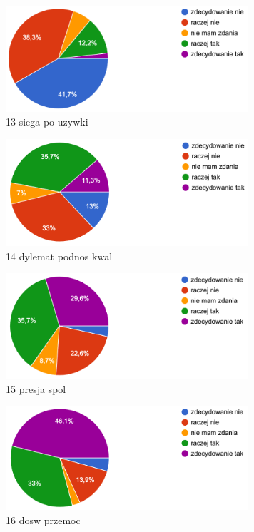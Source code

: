 \documentclass[a4paper,12pt,twoside,openany]{report}
\begin{document}
\begin{figure}
    \includegraphics[width=9cm]{wyniki/13_siega_po_uzywki}
    \caption{ 13 siega po uzywki }
\end{figure}

\begin{figure}
    \includegraphics[width=9cm]{wyniki/14_dylemat_podnos_kwal}
    \caption{ 14 dylemat podnos kwal }
\end{figure}

\begin{figure}
    \includegraphics[width=9cm]{wyniki/15_presja_spol}
    \caption{ 15 presja spol }
\end{figure}

\begin{figure}
    \includegraphics[width=9cm]{wyniki/16_dosw_przemoc}
    \caption{ 16 dosw przemoc }
\end{figure}
\end{document}
